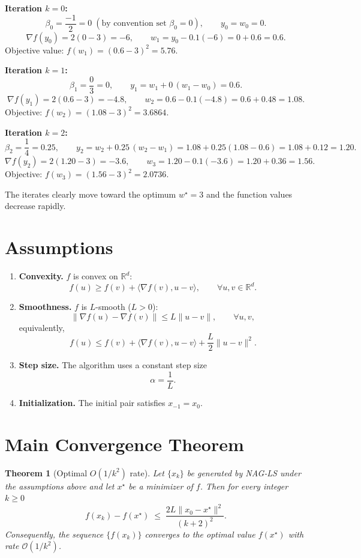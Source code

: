 \documentclass{article}
\newtheorem{theorem}{Theorem}
\newcommand{\grad}{\nabla}
\begin{document}
\medskip
\noindent\textbf{Iteration \(k=0\):}  
\[
\beta_0=\frac{-1}{2}=0\;( \text{by convention set }\beta_0=0),\qquad
y_0 = w_0 =0.
\]
\[
\grad f(y_0)=2(0-3)=-6,\qquad
w_1 = y_0 -0.1(-6)=0+0.6=0.6.
\]
Objective value: \(f(w_1)=(0.6-3)^2=5.76\).

\medskip
\noindent\textbf{Iteration \(k=1\):}  
\[
\beta_1=\frac{0}{3}=0,\qquad
y_1 = w_1 +0\,(w_1-w_0)=0.6.
\]
\[
\grad f(y_1)=2(0.6-3)=-4.8,\qquad
w_2 = 0.6-0.1(-4.8)=0.6+0.48=1.08.
\]
Objective: \(f(w_2)=(1.08-3)^2=3.6864\).

\medskip
\noindent\textbf{Iteration \(k=2\):}  
\[
\beta_2=\frac{1}{4}=0.25,\qquad
y_2 = w_2 +0.25\,(w_2-w_1)=1.08+0.25(1.08-0.6)=1.08+0.12=1.20.
\]
\[
\grad f(y_2)=2(1.20-3)=-3.6,\qquad
w_3 = 1.20-0.1(-3.6)=1.20+0.36=1.56.
\]
Objective: \(f(w_3)=(1.56-3)^2=2.0736\).

The iterates clearly move toward the optimum \(w^\star=3\) and the function values decrease rapidly.

\newpage
\section*{Assumptions}
\begin{enumerate}
\item \textbf{Convexity.}  \(f\) is convex on \(\mathbb{R}^d\):
\[
f(u)\ge f(v)+\langle \grad f(v),u-v\rangle,\qquad\forall u,v\in\mathbb{R}^d.
\]
\item \textbf{Smoothness.}  \(f\) is \(L\)-smooth (\(L>0\)):
\[
\|\grad f(u)-\grad f(v)\|\le L\|u-v\|,\qquad\forall u,v,
\]
equivalently,
\[
f(u)\le f(v)+\langle \grad f(v),u-v\rangle+\frac{L}{2}\|u-v\|^2.
\tag{1}
\]
\item \textbf{Step size.}  The algorithm uses a constant step size
\[
\alpha = \frac{1}{L}.
\]
\item \textbf{Initialization.}  The initial pair satisfies \(x_{-1}=x_0\).
\end{enumerate}

\section*{Main Convergence Theorem}
\begin{theorem}[Optimal \(O(1/k^2)\) rate]\label{thm:main}
Let \(\{x_k\}\) be generated by NAG‑LS under the assumptions above and let
\(x^\star\) be a minimizer of \(f\).  Then for every integer \(k\ge 0\)
\[
f(x_k)-f(x^\star)\;\le\;\frac{2L\|x_0-x^\star\|^2}{(k+2)^2}.
\tag{2}
\]
Consequently, the sequence \(\{f(x_k)\}\) converges to the optimal value
\(f(x^\star)\) with rate \(\mathcal{O}(1/k^2)\).
\end{theorem}
\end{document}
